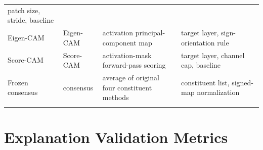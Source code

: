 \begin{longtable}[]{@{}llll@{}}
\begin{minipage}[t]{0.17\columnwidth}
		patch size, stride, baseline\strut
	\end{minipage}\tabularnewline
	\begin{minipage}[t]{0.17\columnwidth}\raggedright
		Eigen-CAM\strut
	\end{minipage} & \begin{minipage}[t]{0.17\columnwidth}\raggedright
		Eigen-CAM\strut
	\end{minipage} & \begin{minipage}[t]{0.17\columnwidth}\raggedright
		activation principal-component map\strut
	\end{minipage} & \begin{minipage}[t]{0.17\columnwidth}\raggedright
		target layer, sign-orientation rule\strut
	\end{minipage}\tabularnewline
	\begin{minipage}[t]{0.17\columnwidth}\raggedright
		Score-CAM\strut
	\end{minipage} & \begin{minipage}[t]{0.17\columnwidth}\raggedright
		Score-CAM\strut
	\end{minipage} & \begin{minipage}[t]{0.17\columnwidth}\raggedright
		activation-mask forward-pass scoring\strut
	\end{minipage} & \begin{minipage}[t]{0.17\columnwidth}\raggedright
		target layer, channel cap, baseline\strut
	\end{minipage}\tabularnewline
	\begin{minipage}[t]{0.17\columnwidth}\raggedright
		Frozen consensus\strut
	\end{minipage} & \begin{minipage}[t]{0.17\columnwidth}\raggedright
		consensus\strut
	\end{minipage} & \begin{minipage}[t]{0.17\columnwidth}\raggedright
		average of original four constituent methods\strut
	\end{minipage} & \begin{minipage}[t]{0.17\columnwidth}\raggedright
		constituent list, signed-map normalization\strut
	\end{minipage}\tabularnewline
	\bottomrule
	\label{table:3-1}
\end{longtable}

\hypertarget{explanation-validation-metrics}{%
	\section{Explanation Validation
		Metrics}\label{explanation-validation-metrics}}


